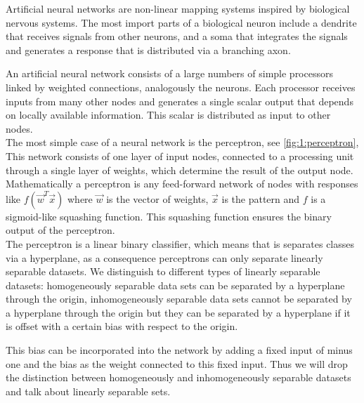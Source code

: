 Artificial neural networks are non-linear mapping systems inspired by biological nervous systems. The most import parts of a biological neuron include a dendrite that receives signals from other neurons, and a soma that integrates the signals and generates a response that is distributed via a branching axon. 

An artificial neural network consists of a large numbers of simple processors linked by weighted connections, analogously the neurons. Each processor receives inputs from many other nodes and generates a single scalar output that depends on locally available information. This scalar is distributed as input to other nodes. \\

The most simple case of a neural network is the perceptron, see \autoref{fig:1:perceptron}, This network consists of one layer of input nodes, connected to a processing unit through a single layer of weights, which determine the result of the output node. Mathematically a perceptron is any feed-forward network of nodes with responses like $f(\vec{w}^T\vec{x})$ where $\vec{w}$ is the vector of weights, $\vec{x}$ is the pattern and $f$ is a sigmoid-like squashing function\cite{reed1998neural}. This squashing function ensures the binary output of the perceptron. \\

The perceptron is a linear binary classifier, which means that is separates classes via a hyperplane, as a consequence perceptrons can only separate linearly separable datasets. We distinguish to different types of linearly separable datasets: homogeneously separable data sets can be separated by a hyperplane through the origin, inhomogeneously separable data sets cannot be separated by a hyperplane through the origin but they can be separated by a hyperplane if it is offset with a certain bias with respect to the origin. 

This bias can be incorporated into the network by adding a fixed input of minus one and the bias as the weight connected to this fixed input. Thus we will drop the distinction between homogeneously and inhomogeneously separable datasets and talk about linearly separable sets. 

